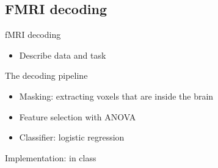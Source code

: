 \documentclass[presentation,mathserif,table]{beamer}
\begin{document}
\subsection{FMRI decoding}
\label{sec:orge90a6ce}
\begin{frame}[label={sec:orgf494b0a}]{fMRI decoding}
\begin{itemize}
\item Describe data and task
\end{itemize}
\end{frame}
\begin{frame}[label={sec:org23976d8}]{The decoding pipeline}
\begin{itemize}
\item Masking: extracting voxels that are inside the brain
\item Feature selection with ANOVA
\item Classifier: logistic regression
\end{itemize}
\end{frame}
\begin{frame}[label={sec:org36585a5}]{Implementation: in class}
\end{frame}
\end{document}
